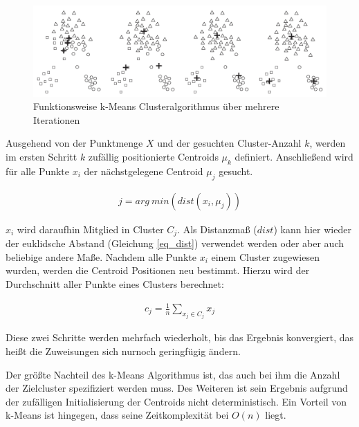 \begin{figure}[H]
    \centering
    \includegraphics[width=0.9\linewidth]{resources/img/grundlagen/k-means}
    \caption[Funktionsweise k-Means Clusteralgorithmus]
            {Funktionsweise k-Means Clusteralgorithmus über mehrere Iterationen \cite[]{tan2007introduction}}
    \label{fig:grund_kmeans_clustering}
\end{figure}

Ausgehend von der Punktmenge $X$ und der gesuchten Cluster-Anzahl $k$,
werden im ersten Schritt $k$ zufällig positionierte Centroids $\mu_k$ definiert.
Anschließend wird für alle Punkte $x_i$ der nächstgelegene Centroid $\mu_j$ gesucht.

\begin{ceqn}
\begin{align}
    \label{eq_kmeans2}
    j = arg\ min(dist(x_i, \mu_j))
\end{align}
\end{ceqn}

$x_i$ wird daraufhin Mitglied in Cluster $C_j$. Als Distanzmaß ($dist$) kann hier wieder der euklidsche Abstand
(Gleichung \ref{eq_dist}) verwendet werden oder aber auch beliebige andere Maße.
Nachdem alle Punkte $x_i$ einem Cluster zugewiesen wurden, werden die Centroid Positionen neu bestimmt.
Hierzu wird der Durchschnitt aller Punkte eines Clusters berechnet:

\begin{ceqn}
\begin{align}
    \label{eq_kmeans3}
    c_j = \frac{1}{n} \sum_{x_j \in C_j} x_j
\end{align}
\end{ceqn}

Diese zwei Schritte werden mehrfach wiederholt, bis das Ergebnis konvergiert, das heißt die Zuweisungen sich
nurnoch geringfügig ändern. \cite[]{Jain2010}

Der größte Nachteil des k-Means Algorithmus ist, das auch bei ihm die Anzahl der Zielcluster spezifiziert
werden muss. Des Weiteren ist sein Ergebnis aufgrund der zufälligen Initialisierung der Centroids
nicht deterministisch. Ein Vorteil von k-Means ist hingegen, dass seine Zeitkomplexität bei $O(n)$ liegt. \cite[]{tan2007introduction}

